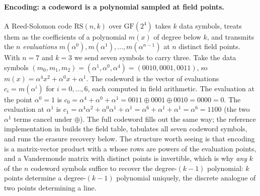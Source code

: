 \paragraph{Encoding: a codeword is a polynomial sampled at field
points.}
A Reed-Solomon code $\mathrm{RS}(n, k)$ over $\mathrm{GF}(2^{4})$ takes
$k$ data symbols, treats them as the coefficients of a polynomial
$m(x)$ of degree below $k$, and transmits the $n$ \emph{evaluations}
$m(\alpha^{0}), m(\alpha^{1}), \ldots, m(\alpha^{n-1})$ at $n$
distinct field points. With $n = 7$ and $k = 3$ we send seven symbols
to carry three. Take the data symbols $(m_{0}, m_{1}, m_{2}) =
(\alpha^{1}, \alpha^{0}, \alpha^{4}) = (0010, 0001, 0011)$, so
$m(x) = \alpha^{4} x^{2} + \alpha^{0} x + \alpha^{1}$. The codeword is
the vector of evaluations $c_{i} = m(\alpha^{i})$ for $i = 0, \ldots,
6$, each computed in field arithmetic. The evaluation at the point
$\alpha^{0} = 1$ is $c_{0} = \alpha^{4} + \alpha^{0} + \alpha^{1} =
0011 \oplus 0001 \oplus 0010 = 0000 = 0$. The evaluation at
$\alpha^{1}$ is $c_{1} = \alpha^{4}\alpha^{2} + \alpha^{0}\alpha^{1}
+ \alpha^{1} = \alpha^{6} + \alpha^{1} + \alpha^{1} = \alpha^{6} =
1100$ (the two $\alpha^{1}$ terms cancel under $\oplus$). The full
codeword fills out the same way; the reference implementation in
builds the field table, tabulates all seven codeword symbols, and runs
the erasure recovery below. The structure worth seeing is that encoding is a
matrix-vector product with a  whose rows
are powers of the evaluation points, and a Vandermonde matrix with
distinct points is invertible, which is why \emph{any} $k$ of the $n$
codeword symbols suffice to recover the degree-$(k-1)$ polynomial:
$k$ points determine a degree-$(k-1)$ polynomial uniquely, the
discrete analogue of two points determining a line.

